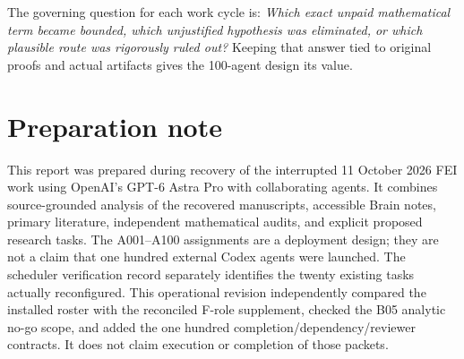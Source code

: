 \documentclass[11pt]{article}
\begin{document}
The governing question for each work cycle is: \emph{Which exact unpaid mathematical term became bounded, which unjustified hypothesis was eliminated, or which plausible route was rigorously ruled out?} Keeping that answer tied to original proofs and actual artifacts gives the 100-agent design its value.

\section*{Preparation note}
This report was prepared during recovery of the interrupted 11 October 2026 FEI work using OpenAI's GPT-6 Astra Pro with collaborating agents. It combines source-grounded analysis of the recovered manuscripts, accessible Brain notes, primary literature, independent mathematical audits, and explicit proposed research tasks. The A001--A100 assignments are a deployment design; they are not a claim that one hundred external Codex agents were launched. The scheduler verification record separately identifies the twenty existing tasks actually reconfigured. This operational revision independently compared the installed roster with the reconciled F-role supplement, checked the B05 analytic no-go scope, and added the one hundred completion/dependency/reviewer contracts. It does not claim execution or completion of those packets.
\end{document}

